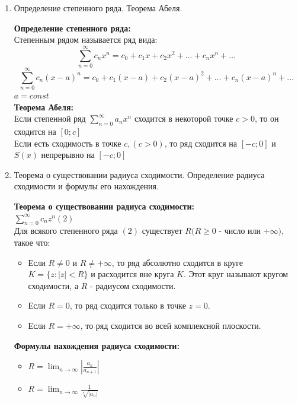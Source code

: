 \documentclass[a4paper, 12pt]{article}
\begin{document}
\begin{enumerate}
\begin{mdframed}
		      $\sum_{n=1}^{\infty} u_n(x_0)$ существует ряд сходящийся в нашей точке $x_0$ и $\sum_{n=1}^{\infty} u'_n(x) \underset{[a;b]}\rightrightarrows$. \\
		      Тогда $\left( \sum_{n=1}^{\infty} u_n(x) \right)' = \sum_{n=1}^{\infty} u'_n(x)$
	      \end{mdframed}
	\item Определение степенного ряда. Теорема Абеля.
	      \begin{mdframed}
		      \textbf{Определение степенного ряда:} \\
		      Степенным рядом называется ряд вида: \\
		      \[
			      \sum_{n=0}^{\infty} c_nx^n = c_0 + c_1x + c_2x^2 + \ldots + c_nx^n + \ldots
		      \]
		      \[
			      \sum_{n=0}^{\infty} c_n(x-a)^n = c_0 + c_1(x-a) + c_2(x-a)^2 + \ldots + c_n(x-a)^n + \ldots
		      \]
		      $a = const$ \\
		      \textbf{Теорема Абеля:} \\
		      Если степенной ряд $\sum_{n=0}^{\infty} a_nx^n$ сходится в некоторой точке $c>0$, то он сходится на $[0;c]$ \\
		      Если есть сходимость в точке  $c, (c>0)$, то ряд сходится на  $[-c;0]$ и  $S(x)$ непрерывно на  $[-c;0]$ \\
	      \end{mdframed}
	\item Теорема о существовании радиуса сходимости. Определение радиуса сходимости и формулы его нахождения. \\
	      \begin{mdframed}
		      \textbf{Теорема о существовании радиуса сходимости:} \\
		      $ \sum_{n=0}^{\infty} c_n z^n (2)$ \\
		      Для всякого степенного ряда $(2)$ существует  $R (R\ge 0$ - число или $+\infty)$, такое что: \\
		      \begin{itemize}
			      \item Если $R \neq 0$ и $R \neq +\infty$, то ряд абсолютно сходится в круге $K = \{z: |z|< R\}$ и расходится вне круга $K$. Этот круг называют кругом сходимости, а $R$ - радиусом сходимости. \\
			      \item Если $R = 0$, то ряд сходится только в точке $z = 0$. \\
			      \item Если $R = +\infty$, то ряд сходится во всей комплексной плоскости. \\
		      \end{itemize}
		      \textbf{Формулы нахождения радиуса сходимости:}
		      \begin{itemize}
			      \item $R = \lim_{n \to \infty} \left| \frac{a_n}{a_{n+1}} \right|$
			      \item $R = \lim_{n \to \infty} \frac{1}{\sqrt[n]{|a_n|}}$
		      \end{itemize}
	      \end{mdframed}
\end{enumerate}
\end{document}
